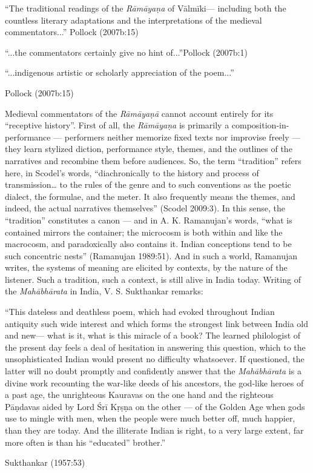 \begin{myquote}
“The traditional readings of the {\sl Rāmāyaṇa} of Vālmīki--- including both the countless literary adaptations and the interpretations of the medieval commentators...”
\hfill	Pollock (2007b:15)

\smallskip

“...the commentators certainly give no hint of...”\hfill  Pollock (2007b:1)
	
“...indigenous artistic or scholarly appreciation of the poem...''

\hfill  Pollock (2007b:15)
\end{myquote}

Medieval commentators of the {\sl Rāmāyaṇā} cannot account entirely for its “receptive history”. First of all, the {\sl Rāmāyaṇa} is primarily a composition-in-performance --- performers neither memorize fixed texts nor improvise freely --- they learn stylized diction, performance style, themes, and the outlines of the narratives and recombine them before audiences.  So, the term “tradition” refers here, in Scodel’s words, “diachronically to the history and process of transmission… to the rules of the genre and to such conventions as the poetic dialect, the formulae, and the meter. It also frequently means the themes, and indeed, the actual narratives themselves” (Scodel 2009:3). In this sense, the “tradition” constitutes a canon --- and in A. K. Ramanujan’s words, “what is contained mirrors the container; the microcosm is both within and like the macrocosm, and paradoxically also contains it. Indian conceptions tend to be such concentric nests” (Ramanujan 1989:51). And in such a world, Ramanujan writes, the systems of meaning are elicited by contexts, by the nature of the listener. Such a tradition, such a context, is still alive in India today. Writing of the {\sl Mahābhārata} in India, V. S. Sukthankar remarks:

\begin{myquote}
“This dateless and deathless poem, which had evoked throughout Indian antiquity such wide interest and which forms the strongest link between India old and new--- what is it, what is this miracle of a book? The learned philologist of the present day feels a deal of hesitation in answering this question, which to the unsophisticated Indian would present no difficulty whatsoever. If questioned, the latter will no doubt promptly and confidently answer that the {\sl Mahābhārata} is a divine work recounting the war-like deeds of his ancestors, the god-like heroes of a past age, the unrighteous Kauravas on the one hand and the righteous Pāṇdavas aided by Lord Śrī Kṛṣṇa on the other --- of the Golden Age when gods use to mingle with men, when the people were much better off, much happier, than they are today. And the illiterate Indian is right, to a very large extent, far more often is than his “educated” brother.” 

\hfill	Sukthankar (1957:53)
\end{myquote}

